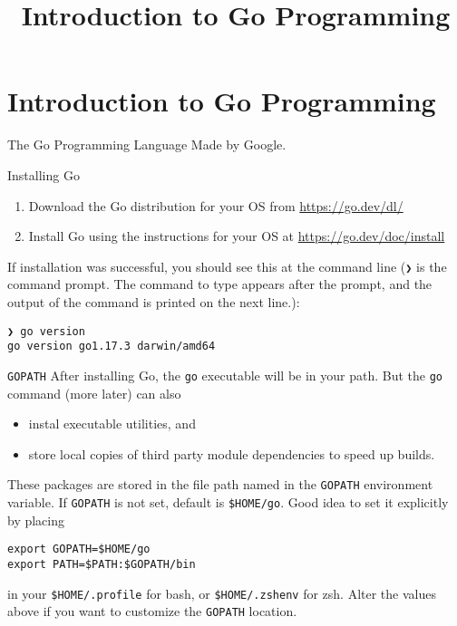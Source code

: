 \documentclass[smaller]{beamer}
\date{}
\title{Introduction to Go Programming}
\begin{document}
\maketitle

\section{Introduction to Go Programming}
\label{sec:orgcb3594a}

\begin{frame}[label={sec:org09fa5af}]{The Go Programming Language}
Made by Google.
\end{frame}


\begin{frame}[label={sec:orgaf0f58b},fragile]{Installing Go}
 \begin{enumerate}
\item Download the Go distribution for your OS from \url{https://go.dev/dl/}
\item Install Go using the instructions for your OS at \url{https://go.dev/doc/install}
\end{enumerate}

If installation was successful, you should see this at the command line (\texttt{❯} is the command prompt.  The command to type appears after the prompt, and the output of the command is printed on the next line.):

\lstset{language=sh,label= ,caption= ,captionpos=b,numbers=none}
\begin{lstlisting}
❯ go version
go version go1.17.3 darwin/amd64
\end{lstlisting}
\end{frame}

\begin{frame}[label={sec:orgb8c1a61},fragile]{\texttt{GOPATH}}
 After installing Go, the \texttt{go} executable will be in your path.  But the \texttt{go} command (more later) can also

\begin{itemize}
\item instal executable utilities, and
\item store local copies of third party module dependencies to speed up builds.
\end{itemize}

These packages are stored in the file path named in the \texttt{GOPATH} environment variable.  If \texttt{GOPATH} is not set, default is \texttt{\$HOME/go}.   Good idea to set it explicitly by placing

\lstset{language=sh,label= ,caption= ,captionpos=b,numbers=none}
\begin{lstlisting}
export GOPATH=$HOME/go
export PATH=$PATH:$GOPATH/bin
\end{lstlisting}

in your \texttt{\$HOME/.profile} for bash, or \texttt{\$HOME/.zshenv} for zsh.  Alter the values above if you want to customize the \texttt{GOPATH} location.
\end{frame}
\end{document}
